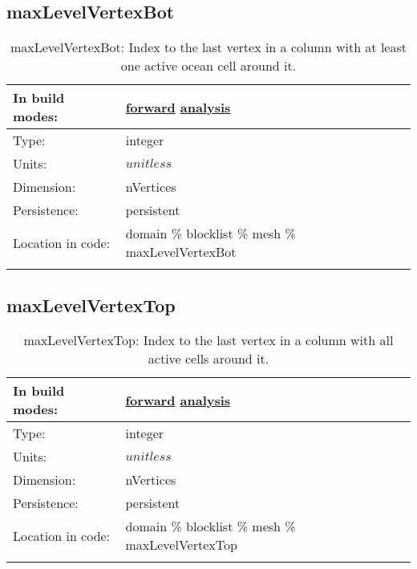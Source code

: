 \subsection[maxLevelVertexBot]{maxLevelVertexBot}
\label{subsec:var_sec_mesh_maxLevelVertexBot}
\begin{center}
\begin{longtable}{| p{2.0in} | p{4.0in} |}
        \hline 
        In build modes: & \hyperref[subsec:forward_var_tab_mesh]{forward} \hyperref[subsec:analysis_var_tab_mesh]{analysis} \\
        \hline 
        Type: & integer \\
        \hline 
        Units: & $unitless$ \\
        \hline 
        Dimension: & nVertices \\
        \hline 
        Persistence: & persistent \\
        \hline 
		 Location in code: & domain \% blocklist \% mesh \% maxLevelVertexBot \\
		 \hline 
    \caption{maxLevelVertexBot: Index to the last vertex in a column with at least one active ocean cell around it.}
\end{longtable}
\end{center}
\subsection[maxLevelVertexTop]{maxLevelVertexTop}
\label{subsec:var_sec_mesh_maxLevelVertexTop}
\begin{center}
\begin{longtable}{| p{2.0in} | p{4.0in} |}
        \hline 
        In build modes: & \hyperref[subsec:forward_var_tab_mesh]{forward} \hyperref[subsec:analysis_var_tab_mesh]{analysis} \\
        \hline 
        Type: & integer \\
        \hline 
        Units: & $unitless$ \\
        \hline 
        Dimension: & nVertices \\
        \hline 
        Persistence: & persistent \\
        \hline 
		 Location in code: & domain \% blocklist \% mesh \% maxLevelVertexTop \\
		 \hline 
    \caption{maxLevelVertexTop: Index to the last vertex in a column with all active cells around it.}
\end{longtable}
\end{center}
